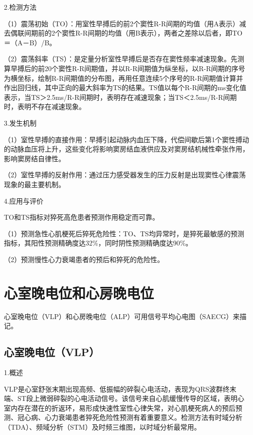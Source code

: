 2.检测方法

（1）震荡初始（TO）：用室性早搏后的前2个窦性R-R间期的均值（用A表示）减去偶联间期前的2个窦性R-R间期的均值（用B表示），两者之差除以后者，即TO＝（A－B）/B。

（2）震荡斜率（TS）：是定量分析室性早搏后是否存在窦性频率减速现象。先测算早搏后的前20个窦性R-R间期值，并以R-R间期值为纵坐标，以R-R间期的序号为横坐标，绘制R-R间期值的分布图，再用任意连续5个序号的R-R间期值计算并作出回归线，其中正向的最大斜率为TS的结果。TS值以每个R-R间期的ms变化值表示，当TS＞2.5ms/R-R间期时，表明存在减速现象；当TS＜2.5ms/R-R间期时，表明不存在减速现象。

3.发生机制

（1）室性早搏的直接作用：早搏引起动脉内血压下降，代偿间歇后第1个窦性搏动的动脉血压将上升，这些变化将影响窦房结血液供应及对窦房结机械性牵张作用，影响窦房结自律性。

（2）室性早搏的反射作用：通过压力感受器发生的压力反射是出现窦性心律震荡现象的最主要机制。

4.应用与评价

TO和TS指标对猝死高危患者预测作用稳定而可靠。

（1）预测急性心肌梗死后猝死危险性：TO、TS均异常时，是猝死最敏感的预测指标，其阳性预测精确度达32\%，同时阴性预测精确度达90\%。

（2）预测慢性心力衰竭患者的预后和猝死的危险性。

\protect\hypertarget{text00056.htmlux5cux23subid662}{}{}

\section{心室晚电位和心房晚电位}

心室晚电位（VLP）和心房晚电位（ALP）可用信号平均心电图（SAECG）来描记。

\protect\hypertarget{text00056.htmlux5cux23subid663}{}{}

\subsection{心室晚电位（VLP）}

1.概述

VLP是心室舒张末期出现高频、低振幅的碎裂心电活动，表现为QRS波群终末端、ST段上微弱碎裂的心电活动信号。该信号来自心肌缓慢传导的区域，表明心室内存在潜在的折返环，易形成快速性室性心律失常，对心肌梗死病人的预后预测、冠心病、心力衰竭患者猝死危险性预测有着重要意义。检测方法有时域分析（TDA）、频域分析（STM）及时频三维图，以时域分析最常用。

